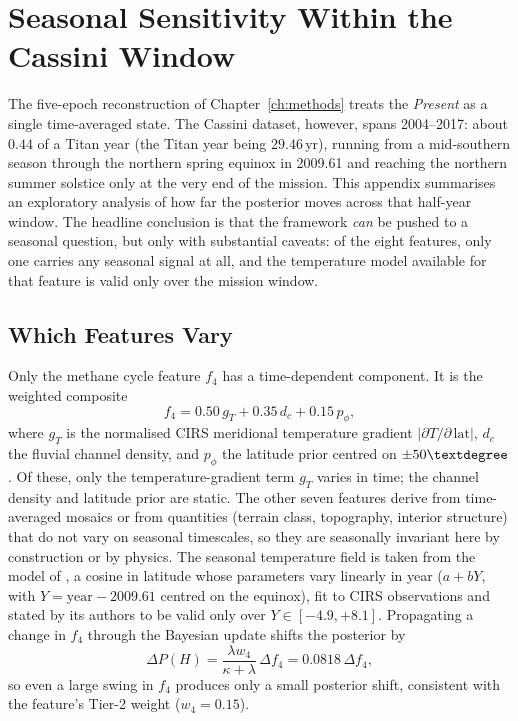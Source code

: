
\chapter{Seasonal Sensitivity Within the Cassini Window}
\label{app:seasonal}

The five-epoch reconstruction of Chapter~\ref{ch:methods} treats the
\textit{Present} as a single time-averaged state.  The Cassini dataset,
however, spans 2004--2017: about $0.44$ of a Titan year (the Titan year being
$29.46$\,yr), running from a mid-southern season through the northern spring
equinox in 2009.61 and reaching the northern summer solstice only at the very
end of the mission.  This appendix summarises an exploratory analysis of how
far the posterior moves across that half-year window.  The headline conclusion
is that the framework \emph{can} be pushed to a seasonal question, but only
with substantial caveats: of the eight features, only one carries any seasonal
signal at all, and the temperature model available for that feature is valid
only over the mission window.

\section{Which Features Vary}
\label{sec:seasonal_which}

Only the methane cycle feature $f_4$ has a time-dependent component.  It is
the weighted composite
\[
  f_4 = 0.50\,g_T + 0.35\,d_c + 0.15\,p_\phi,
\]
where $g_T$ is the normalised CIRS meridional temperature gradient
$|\partial T/\partial\,\mathrm{lat}|$, $d_c$ the fluvial channel density, and
$p_\phi$ the latitude prior centred on $\pm 50\textdegree$.  Of these, only the
temperature-gradient term $g_T$ varies in time; the channel density and
latitude prior are static.  The other seven features derive from
time-averaged mosaics or from quantities (terrain class, topography, interior
structure) that do not vary on seasonal timescales, so they are seasonally
invariant here by construction or by physics.  The seasonal temperature field
is taken from the model of \citet{Jennings2019}, a cosine in latitude whose
parameters vary linearly in year ($a + bY$, with $Y = \text{year} - 2009.61$
centred on the equinox), fit to CIRS observations and stated by its authors to
be valid only over $Y \in [-4.9, +8.1]$.  Propagating a change in $f_4$
through the Bayesian update shifts the posterior by
\[
  \Delta P(H) = \frac{\lambda w_4}{\kappa + \lambda}\,\Delta f_4
  = 0.0818\,\Delta f_4,
\]
so even a large swing in $f_4$ produces only a small posterior shift,
consistent with the feature's Tier-2 weight ($w_4 = 0.15$).

